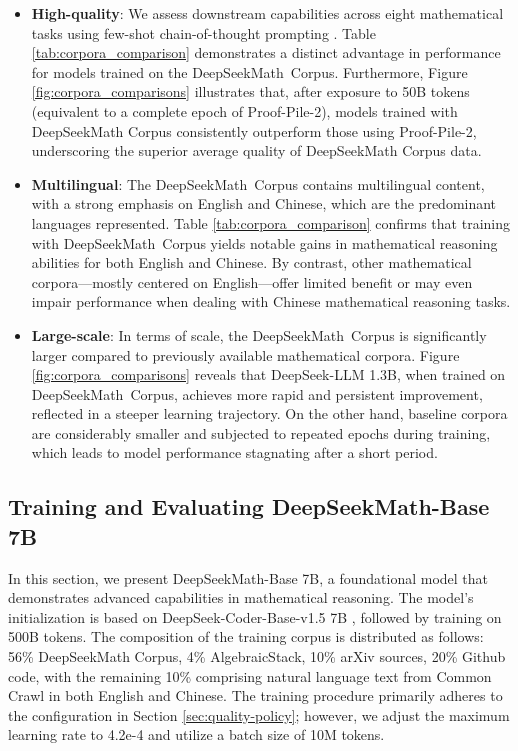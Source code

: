 \begin{itemize}[topsep=0pt]
\begin{itemize}[topsep=0pt]
    \item \textbf{High-quality}:
    We assess downstream capabilities across eight mathematical tasks using few-shot chain-of-thought prompting \cite{cot}. Table \ref{tab:corpora_comparison} demonstrates a distinct advantage in performance for models trained on the DeepSeekMath~Corpus. Furthermore, Figure \ref{fig:corpora_comparisons} illustrates that, after exposure to 50B tokens (equivalent to a complete epoch of Proof-Pile-2), models trained with DeepSeekMath Corpus consistently outperform those using Proof-Pile-2, underscoring the superior average quality of DeepSeekMath Corpus data.
    \item \textbf{Multilingual}:
    The DeepSeekMath~Corpus contains multilingual content, with a strong emphasis on English and Chinese, which are the predominant languages represented. Table \ref{tab:corpora_comparison} confirms that training with DeepSeekMath~Corpus yields notable gains in mathematical reasoning abilities for both English and Chinese. By contrast, other mathematical corpora—mostly centered on English—offer limited benefit or may even impair performance when dealing with Chinese mathematical reasoning tasks.
    \item \textbf{Large-scale}:
    In terms of scale, the DeepSeekMath~Corpus is significantly larger compared to previously available mathematical corpora. Figure \ref{fig:corpora_comparisons} reveals that DeepSeek-LLM 1.3B, when trained on DeepSeekMath~Corpus, achieves more rapid and persistent improvement, reflected in a steeper learning trajectory. On the other hand, baseline corpora are considerably smaller and subjected to repeated epochs during training, which leads to model performance stagnating after a short period.
\end{itemize}

\subsection{Training and Evaluating DeepSeekMath-Base 7B}

In this section, we present DeepSeekMath-Base 7B, a foundational model that demonstrates advanced capabilities in mathematical reasoning. The model’s initialization is based on DeepSeek-Coder-Base-v1.5 7B \citep{deepseek-coder}, followed by training on 500B tokens. The composition of the training corpus is distributed as follows: 56\% DeepSeekMath Corpus, 4\% AlgebraicStack, 10\% arXiv sources, 20\% Github code, with the remaining 10\% comprising natural language text from Common Crawl in both English and Chinese. The training procedure primarily adheres to the configuration in Section \ref{sec:quality-policy}; however, we adjust the maximum learning rate to 4.2e-4 and utilize a batch size of 10M tokens.


\end{itemize}
